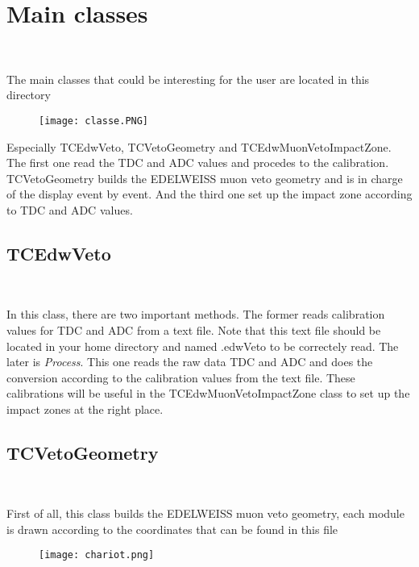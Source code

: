 \documentclass[12pt, a4paper]{article}
\begin{document}
\section{Main classes}

~

The main classes that could be interesting for the user are located in this directory 


\begin{figure} [H]
\begin{center}
\texttt{[image: classe.PNG]}
\end{center}
\end{figure}


Especially TCEdwVeto, TCVetoGeometry and  TCEdwMuonVetoImpactZone. The first one read the TDC and ADC values and procedes to the calibration. TCVetoGeometry builds the EDELWEISS muon veto geometry and is in charge of the display event by event. And the third one set up the impact zone according to TDC and ADC values. 


\subsection{TCEdwVeto}

~

In this class, there are two important methods. The former reads calibration values for TDC and ADC from a text file. Note that this text file should be located in your home directory and named .edwVeto to be correctely read. The later is \emph{Process}. This one reads the raw data TDC and ADC and does the conversion according to the calibration values from the text file. These calibrations will be useful in the TCEdwMuonVetoImpactZone class to set up the impact zones at the right place. 


\subsection{TCVetoGeometry}

~

First of all, this class builds the EDELWEISS muon veto geometry, each module is drawn according to the coordinates that can be found in this file 


\begin{figure} [H]
\begin{center}
\texttt{[image: chariot.png]}
\end{center}
\end{figure}
\end{document}

